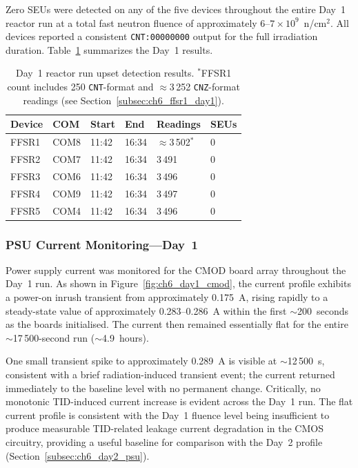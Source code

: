 Zero SEUs were detected on any of the five devices throughout the entire
Day~1 reactor run at a total fast neutron fluence of approximately
$6$--$7 \times 10^9$~n/cm$^2$.  All devices reported a consistent
\texttt{CNT:00000000} output for the full irradiation duration.
Table~\ref{tab:ch6_day1_results} summarizes the Day~1 results.

\begin{table}[htbp]
    \centering
    \caption{Day~1 reactor run upset detection results.  $^{*}$FFSR1
        count includes 250 \texttt{CNT}-format and $\approx$3\,252
        \texttt{CNZ}-format readings (see
        Section~\ref{subsec:ch6_ffsr1_day1}).}
    \label{tab:ch6_day1_results}
    \begin{tabular}{llllll}
        \toprule
        \textbf{Device} & \textbf{COM} & \textbf{Start}
            & \textbf{End} & \textbf{Readings} & \textbf{SEUs} \\
        \midrule
        FFSR1 & COM8 & 11:42 & 16:34 & $\approx$3\,502$^*$ & 0 \\
        FFSR2 & COM7 & 11:42 & 16:34 & 3\,491               & 0 \\
        FFSR3 & COM6 & 11:42 & 16:34 & 3\,496               & 0 \\
        FFSR4 & COM9 & 11:42 & 16:34 & 3\,497               & 0 \\
        FFSR5 & COM4 & 11:42 & 16:34 & 3\,496               & 0 \\
        \bottomrule
    \end{tabular}
\end{table}

\subsubsection{PSU Current Monitoring---Day~1}

Power supply current was monitored for the CMOD board array throughout
the Day~1 run.  As shown in Figure~\ref{fig:ch6_day1_cmod}, the current
profile exhibits a power-on inrush transient from approximately 0.175~A,
rising rapidly to a steady-state value of approximately 0.283--0.286~A
within the first $\sim$200~seconds as the boards initialised.  The
current then remained essentially flat for the entire
$\sim$17\,500-second run ($\sim$4.9~hours).

One small transient spike to approximately 0.289~A is visible at
$\sim$12\,500~s, consistent with a brief radiation-induced transient
event; the current returned immediately to the baseline level with no
permanent change.  Critically, no monotonic TID-induced current increase
is evident across the Day~1 run.  The flat current profile is consistent
with the Day~1 fluence level being insufficient to produce measurable
TID-related leakage current degradation in the CMOS circuitry, providing
a useful baseline for comparison with the Day~2 profile
(Section~\ref{subsec:ch6_day2_psu}).

